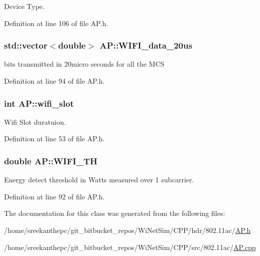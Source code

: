 Device Type. 



Definition at line 106 of file A\-P.\-h.

\hypertarget{classAP_acbd517e31b830c7aebf62f9ea9635f93}{
\subsubsection[{W\-I\-F\-I\-\_\-data\-\_\-20us}]{\setlength{\rightskip}{0pt plus 5cm}std\-::vector$<$double$>$ A\-P\-::\-W\-I\-F\-I\-\_\-data\-\_\-20us\hspace{0.3cm}{\ttfamily [private]}}}\label{classAP_acbd517e31b830c7aebf62f9ea9635f93}


bits transmitted in 20micro seconds for all the M\-C\-S 



Definition at line 94 of file A\-P.\-h.

\hypertarget{classAP_a48aa019a03aefd3ee980a9112441234b}{
\subsubsection[{wifi\-\_\-slot}]{\setlength{\rightskip}{0pt plus 5cm}int A\-P\-::wifi\-\_\-slot\hspace{0.3cm}{\ttfamily [private]}}}\label{classAP_a48aa019a03aefd3ee980a9112441234b}


Wifi Slot duratuion. 



Definition at line 53 of file A\-P.\-h.

\hypertarget{classAP_a42bd4510621509219054811e7350bf29}{
\subsubsection[{W\-I\-F\-I\-\_\-\-T\-H}]{\setlength{\rightskip}{0pt plus 5cm}double A\-P\-::\-W\-I\-F\-I\-\_\-\-T\-H\hspace{0.3cm}{\ttfamily [private]}}}\label{classAP_a42bd4510621509219054811e7350bf29}


Energy detect threshold in Watts measured over 1 subcarrier. 



Definition at line 92 of file A\-P.\-h.



The documentation for this class was generated from the following files\-:\begin{DoxyCompactItemize}
\item 
/home/sreekanthepc/git\-\_\-bitbucket\-\_\-repos/\-Wi\-Net\-Sim/\-C\-P\-P/hdr/802.\-11ac/\hyperlink{AP_8h}{A\-P.\-h}\item 
/home/sreekanthepc/git\-\_\-bitbucket\-\_\-repos/\-Wi\-Net\-Sim/\-C\-P\-P/src/802.\-11ac/\hyperlink{AP_8cpp}{A\-P.\-cpp}\end{DoxyCompactItemize}
